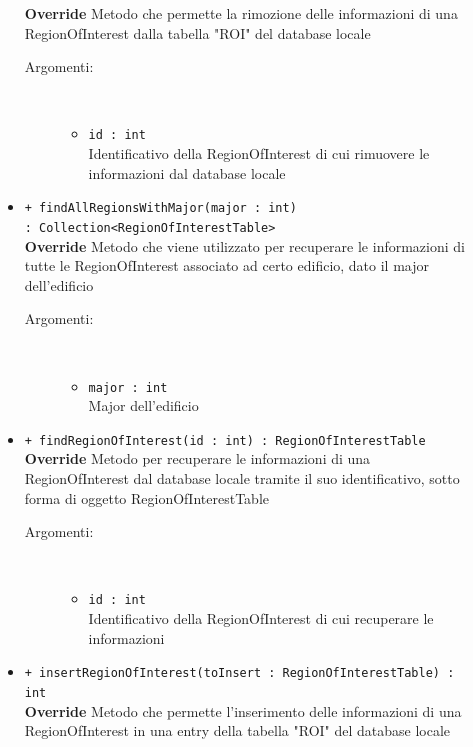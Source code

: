 \documentclass[../DefinizioneDiProdotto.tex]{subfiles}
\begin{document}
\begin{description}
\begin{itemize}
		\textbf{Override} Metodo che permette la rimozione delle informazioni di una RegionOfInterest dalla tabella "ROI" del database locale
		\begin{description}
			\item[Argomenti:] \
			\begin{itemize}
				\item \texttt{id : int}\\
				Identificativo della RegionOfInterest di cui rimuovere le informazioni dal database locale\end{itemize}
		\end{description}
		\item \texttt{+ findAllRegionsWithMajor(major : int) \\ : Collection<RegionOfInterestTable>}\\
		\textbf{Override} Metodo che viene utilizzato per recuperare le informazioni di tutte le RegionOfInterest associato ad certo edificio, dato il major dell'edificio
		\begin{description}
			\item[Argomenti:] \
			\begin{itemize}
				\item \texttt{major : int}\\
				Major dell'edificio\end{itemize}
		\end{description}
		\item \texttt{+ findRegionOfInterest(id : int) : RegionOfInterestTable}\\
		\textbf{Override} Metodo per recuperare le informazioni di una RegionOfInterest dal database locale tramite il suo identificativo, sotto forma di oggetto RegionOfInterestTable
		\begin{description}
			\item[Argomenti:] \
			\begin{itemize}
				\item \texttt{id : int}\\
				Identificativo della RegionOfInterest di cui recuperare le informazioni\end{itemize}
		\end{description}
		\item \texttt{+ insertRegionOfInterest(toInsert : RegionOfInterestTable) : int}\\
		\textbf{Override} Metodo che permette l'inserimento delle informazioni di una RegionOfInterest in una entry della tabella "ROI" del database locale
		\begin{description}

\end{description}
\end{itemize}
\end{description}
\end{document}
